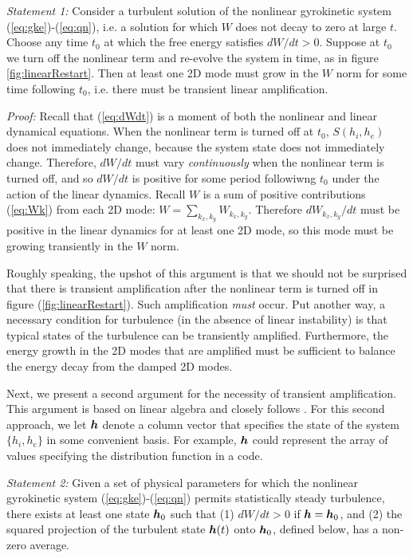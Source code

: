 \documentclass[12pt,superscriptaddress]{revtex4}
\newcommand{\vect}[1]{\mbox{\boldmath $#1$}}
\begin{document}
{\it Statement 1:} Consider a turbulent solution of the nonlinear gyrokinetic system (\ref{eq:gke})-(\ref{eq:qn}),
i.e. a solution for which $W$ does not decay to zero at large $t$.
Choose any time $t_0$ at which the free energy satisfies $dW/dt>0$.
Suppose at $t_0$ we turn off the nonlinear term
and re-evolve the system in time, as in figure \ref{fig:linearRestart}.
Then at least one 2D mode must grow in the $W$ norm
for some time following $t_0$, i.e. there must be transient linear amplification.

{\it Proof:}
Recall that (\ref{eq:dWdt}) is a moment of both the nonlinear and linear dynamical equations.
When the nonlinear term is turned off at $t_0$, $S(h_i,h_e)$ does not immediately change, because
the system state does not immediately change. Therefore, $dW/dt$ must vary \emph{continuously}
when the nonlinear term is turned off, and so $dW/dt$ is positive for some period followiwng $t_0$ under the 
action of the linear dynamics.
Recall $W$ is a sum of positive contributions (\ref{eq:Wk}) from each 2D mode:
$W = \sum_{k_x,k_y} W_{k_x,k_y}$.
Therefore $dW_{k_x,k_y}/dt$ must be positive in the linear dynamics for at least one 2D mode,
so this mode must be growing transiently in the $W$ norm.

Roughly speaking, the upshot of this argument is that we should not be surprised that there is transient amplification
after the nonlinear term is turned off in figure (\ref{fig:linearRestart}).
Such amplification \emph{must} occur.
Put another way, a necessary condition
for turbulence (in the absence of linear instability) is that typical states of the turbulence
can be transiently amplified. Furthermore, the energy growth in the 2D modes that are amplified
must be sufficient to balance the energy decay from the damped 2D modes.

Next, we present a second argument for the necessity of transient amplification.
This argument is based on linear algebra and closely follows \cite{DelSoleNecessity}.  
For this second approach, we let $\vect{h}$ denote
a column vector that specifies the state of the system $\{h_i,h_e\}$ in some convenient basis.
For example, $\vect{h}$ could represent the array of values specifying the distribution function in a code.

{\it Statement 2:} Given a set of physical parameters for which
the nonlinear gyrokinetic system (\ref{eq:gke})-(\ref{eq:qn})
permits statistically steady turbulence,
there exists at least one state $\vect{h}_0$ such that
(1) $dW/dt>0$ if $\vect{h} = \vect{h}_0$, and
(2) the squared projection of the turbulent state $\vect{h}(t)$ 
onto $\vect{h}_0$, defined below, has a non-zero average.
\end{document}
